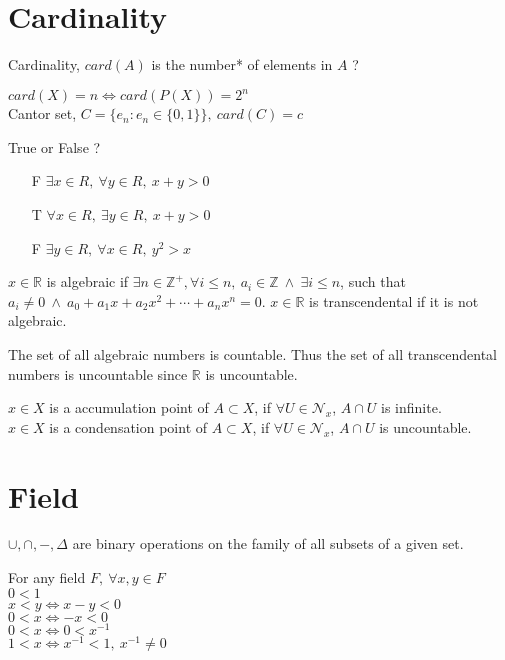 \section{Cardinality}
	\begin{definition}
		Cardinality, $card(A)$ is the number* of elements in $A$ ?
	\end{definition}
	\begin{remark}
		$card(X)=n \iff card(P(X))=2^n$\\
		Cantor set, $C = \{ e_n : e_n \in \{0,1\} \},\ card(C)=c$
	\end{remark}
	\begin{remark}True or False ?
		\begin{enumerate}
		 \item[F] $\exists x \in R,\ \forall y \in R,\ x+y > 0$
		 \item[T] $\forall x \in R,\ \exists y \in R,\ x+y > 0$
		 \item[F] $\exists y \in R,\ \forall x \in R,\ y^2 > x$
		\end{enumerate}
	\end{remark}
	\begin{definition}
		$x \in \mathbb{R}$ is algebraic if $\exists n \in \mathbb{Z}^+, \forall i \leq n,\ a_i \in \mathbb{Z}\ \wedge \ \exists i \le n$, such that $a_i \neq 0\ \wedge \ a_0 + a_1 x + a_2 x^2 + \cdots + a_n x^n = 0$.
		$x \in \mathbb{R}$ is transcendental if it is not algebraic.
	\end{definition}
	\begin{remark}
		The set of all algebraic numbers is countable. Thus the set of all transcendental numbers is uncountable since $\mathbb{R}$ is uncountable.
	\end{remark}
	\begin{definition}
		$x \in X$ is a accumulation point of $A \subset X$, if $\forall U \in \mathcal{N}_x$, $A\cap U$ is infinite.\\
		$x \in X$ is a condensation point\cite{khar2} of $A \subset X$, if $\forall U \in \mathcal{N}_x$, $A\cap U$ is uncountable.
	\end{definition}
\section{Field}
	\begin{remark}
		$\cup,\cap,-,\Delta$ are binary operations on the family of all subsets of a given set.
	\end{remark}
	\begin{remark}For any field $F,\ \forall x,y \in F$\\
	$0 < 1$\\
		$x < y \iff x-y < 0$\\
		$0 < x \iff -x < 0$\\
		$0 < x \iff 0 < x^{-1}$\\
		$1 < x \iff x^{-1} < 1,\ x^{-1} \neq 0$
	\end{remark}
